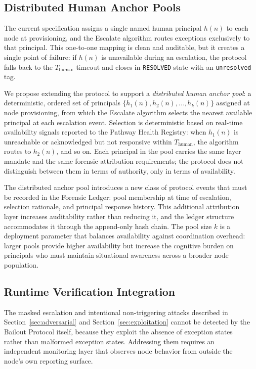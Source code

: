 \subsection{Distributed Human Anchor Pools}
\label{sec:distributed-anchors}

The current specification assigns a single named human principal $h(n)$ to each node at provisioning, and the Escalate algorithm routes exceptions exclusively to that principal. This one-to-one mapping is clean and auditable, but it creates a single point of failure: if $h(n)$ is unavailable during an escalation, the protocol falls back to the $T_{\text{human}}$ timeout and closes in \texttt{RESOLVED} state with an \texttt{unresolved} tag.

We propose extending the protocol to support a \emph{distributed human anchor pool}: a deterministic, ordered set of principals $\{h_1(n), h_2(n), \dots, h_k(n)\}$ assigned at node provisioning, from which the Escalate algorithm selects the nearest available principal at each escalation event. Selection is deterministic based on real-time availability signals reported to the Pathway Health Registry: when $h_1(n)$ is unreachable or acknowledged but not responsive within $T_{\text{human}}$, the algorithm routes to $h_2(n)$, and so on. Each principal in the pool carries the same \purpose{} layer mandate and the same forensic attribution requirements; the protocol does not distinguish between them in terms of authority, only in terms of availability.

The distributed anchor pool introduces a new class of protocol events that must be recorded in the Forensic Ledger: pool membership at time of escalation, selection rationale, and principal response history. This additional attribution layer increases auditability rather than reducing it, and the ledger structure accommodates it through the append-only hash chain. The pool size $k$ is a deployment parameter that balances availability against coordination overhead: larger pools provide higher availability but increase the cognitive burden on principals who must maintain situational awareness across a broader node population.

\subsection{Runtime Verification Integration}
\label{sec:runtime-verification}

The masked escalation and intentional non-triggering attacks described in Section~\ref{sec:adversarial} and Section~\ref{sec:exploitation} cannot be detected by the Bailout Protocol itself, because they exploit the absence of exception states rather than malformed exception states. Addressing them requires an independent monitoring layer that observes node behavior from outside the node's own reporting surface.

